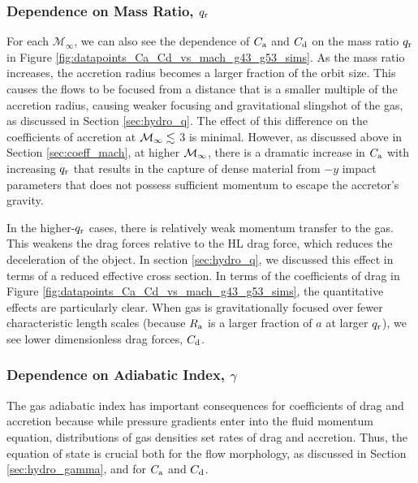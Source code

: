 \subsubsection{Dependence on Mass Ratio, $q_{\rm r}$}\label{sec:coeff_q}

For each $\mathcal{M}_\infty$, we can also see the dependence of $C_{\rm a}$ and $C_{\rm d}$ on the mass ratio $q_{\rm r}$ in Figure \ref{fig:datapoints_Ca_Cd_vs_mach_g43_g53_sims}. As the mass ratio increases, the accretion radius becomes a larger fraction of the orbit size. This causes the flows to be focused from a distance that is a smaller multiple of the accretion radius, causing weaker focusing and gravitational slingshot of the gas, as discussed in Section \ref{sec:hydro_q}. The effect of this difference on the coefficients of accretion at $\cal{M}_\infty \lesssim$ 3 is minimal. However, as discussed above in Section \ref{sec:coeff_mach},  at higher $\cal{M}_\infty$, there is a dramatic increase in $C_{\rm a}$ with increasing $q_{\rm r}$ that results in the capture of dense material from $-y$ impact parameters that does not possess sufficient momentum to escape the accretor's gravity. 

In the higher-$q_{\rm r}$ cases, there is relatively weak momentum transfer to the gas. This weakens the drag forces relative to the HL drag force, which reduces the deceleration of the object. In section \ref{sec:hydro_q}, we discussed this effect in terms of a reduced effective cross section. In terms of the coefficients of drag in Figure \ref{fig:datapoints_Ca_Cd_vs_mach_g43_g53_sims}, the quantitative effects are particularly clear. When gas is gravitationally focused over fewer characteristic length scales (because $R_{\rm a}$ is a larger fraction of $a$ at larger $q_{\rm r}$), we see lower dimensionless drag forces, $C_{\rm d}$. 

\subsubsection{Dependence on Adiabatic Index, $\gamma$}\label{sec:coeff_gamma}

The gas adiabatic index has important consequences for coefficients of drag and accretion because while pressure gradients enter into the fluid momentum equation, distributions of gas densities set rates of drag and accretion. Thus, the equation of state is crucial both for the flow morphology, as discussed in Section \ref{sec:hydro_gamma}, and for $C_{\rm a}$ and $C_{\rm d}$.

